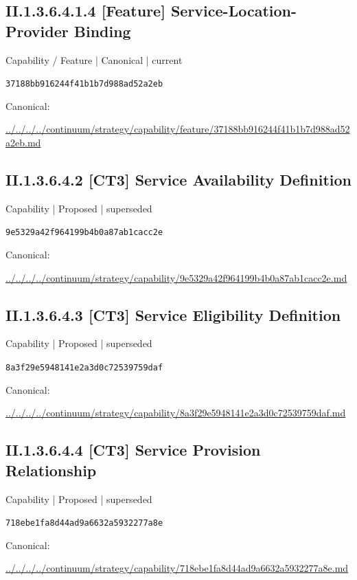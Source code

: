 \documentclass[10pt,a4paper]{article}
\begin{document}
\subsection*{II.1.3.6.4.1.4 [Feature] Service-Location-Provider Binding}
{\small Capability / Feature | Canonical | current}\par
\texttt{37188bb916244f41b1b7d988ad52a2eb}\par
Canonical: \par
{\footnotesize\url{../../../../continuum/strategy/capability/feature/37188bb916244f41b1b7d988ad52a2eb.md}}\par
\subsection*{II.1.3.6.4.2 [CT3] Service Availability Definition}
{\small Capability | Proposed | superseded}\par
\texttt{9e5329a42f964199b4b0a87ab1cacc2e}\par
Canonical: \par
{\footnotesize\url{../../../../continuum/strategy/capability/9e5329a42f964199b4b0a87ab1cacc2e.md}}\par
\subsection*{II.1.3.6.4.3 [CT3] Service Eligibility Definition}
{\small Capability | Proposed | superseded}\par
\texttt{8a3f29e5948141e2a3d0c72539759daf}\par
Canonical: \par
{\footnotesize\url{../../../../continuum/strategy/capability/8a3f29e5948141e2a3d0c72539759daf.md}}\par
\subsection*{II.1.3.6.4.4 [CT3] Service Provision Relationship}
{\small Capability | Proposed | superseded}\par
\texttt{718ebe1fa8d44ad9a6632a5932277a8e}\par
Canonical: \par
{\footnotesize\url{../../../../continuum/strategy/capability/718ebe1fa8d44ad9a6632a5932277a8e.md}}\par
\end{document}
